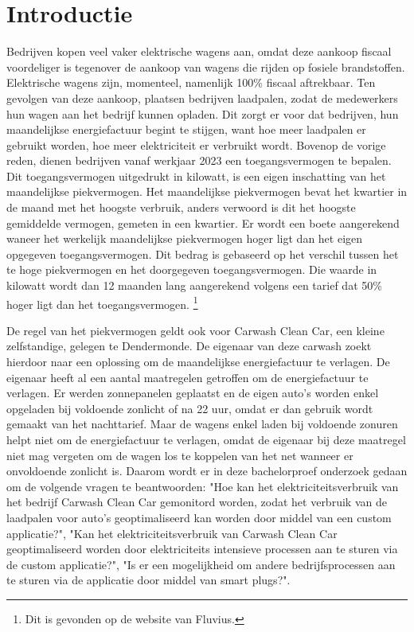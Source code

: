 
\section{Introductie}%
\label{sec:introductie}

Bedrijven kopen veel vaker elektrische wagens aan, omdat deze aankoop fiscaal voordeliger is tegenover de aankoop van wagens die rijden op fosiele brandstoffen. Elektrische wagens zijn, momenteel, namenlijk 100\% fiscaal aftrekbaar. Ten gevolgen van deze aankoop, plaatsen bedrijven laadpalen, zodat de medewerkers hun wagen aan het bedrijf kunnen opladen. Dit zorgt er voor dat bedrijven, hun maandelijkse energiefactuur begint te stijgen, want hoe meer laadpalen er gebruikt worden, hoe meer elektriciteit er verbruikt wordt. Bovenop de vorige reden, dienen bedrijven vanaf werkjaar 2023 een toegangsvermogen te bepalen. Dit toegangsvermogen uitgedrukt in kilowatt, is een eigen inschatting van het maandelijkse piekvermogen. Het maandelijkse piekvermogen bevat het kwartier in de maand met het hoogste verbruik, anders verwoord is dit het hoogste gemiddelde vermogen, gemeten in een kwartier. Er wordt een boete aangerekend waneer het werkelijk maandelijkse piekvermogen hoger ligt dan het eigen opgegeven toegangsvermogen. Dit bedrag is gebaseerd op het verschil tussen het te hoge piekvermogen en het doorgegeven toegangsvermogen. Die waarde in kilowatt wordt dan 12 maanden lang aangerekend volgens een tarief dat 50\% hoger ligt dan het toegangsvermogen. \footnote{Dit is gevonden op de website van Fluvius.}

De regel van het piekvermogen geldt ook voor Carwash Clean Car, een kleine zelfstandige, gelegen te Dendermonde. De eigenaar van deze carwash zoekt hierdoor naar een oplossing om de maandelijkse energiefactuur te verlagen. De eigenaar heeft al een aantal maatregelen getroffen om de energiefactuur te verlagen. Er werden zonnepanelen geplaatst en de eigen auto's worden enkel opgeladen bij voldoende zonlicht of na 22 uur, omdat er dan gebruik wordt gemaakt van het nachttarief. Maar de wagens enkel laden bij voldoende zonuren helpt niet om de energiefactuur te verlagen, omdat de eigenaar bij deze maatregel niet mag vergeten om de wagen los te koppelen van het net wanneer er onvoldoende zonlicht is. Daarom wordt er in deze bachelorproef onderzoek gedaan om de volgende vragen te beantwoorden: "Hoe kan het elektriciteitsverbruik van het bedrijf Carwash Clean Car gemonitord worden, zodat het verbruik van de laadpalen voor auto's geoptimaliseerd kan worden door middel van een custom applicatie?", "Kan het elektriciteitsverbruik van Carwash Clean Car geoptimaliseerd worden door elektriciteits intensieve processen aan te sturen via de custom applicatie?", "Is er een mogelijkheid om andere bedrijfsprocessen aan te sturen via de applicatie door middel van smart plugs?".

